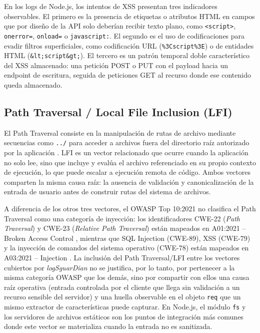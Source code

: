 En los logs de Node.js, los intentos de XSS presentan tres indicadores observables. El primero es
la presencia de etiquetas o atributos HTML en campos que por diseño de la API solo deberían
recibir texto plano, como \texttt{<script>}, \texttt{onerror=}, \texttt{onload=} o \texttt{javascript:}.
El segundo es el uso de codificaciones para evadir filtros superficiales, como codificación URL
(\texttt{\%3Cscript\%3E}) o de entidades HTML (\texttt{\&lt;script\&gt;}). El tercero es un patrón
temporal doble característico del XSS almacenado: una petición POST o PUT con el payload hacia
un endpoint de escritura, seguida de peticiones GET al recurso donde ese contenido queda
almacenado.

\subsection{Path Traversal / Local File Inclusion (LFI)}
El Path Traversal consiste en la manipulación de rutas de archivo mediante secuencias como
\texttt{../} para acceder a archivos fuera del directorio raíz autorizado por la aplicación \cite{owasptraversal}. LFI es un vector relacionado que ocurre cuando la aplicación
no solo lee, sino que incluye y evalúa el archivo referenciado en su propio contexto de
ejecución, lo que puede escalar a ejecución remota de código. Ambos vectores comparten la misma
causa raíz: la ausencia de validación y canonicalización de la entrada de usuario antes de
construir rutas del sistema de archivos.

A diferencia de los otros tres vectores, el OWASP Top 10:2021 no clasifica el Path Traversal
como una categoría de inyección: los identificadores CWE-22 (\textit{Path Traversal}) y CWE-23
(\textit{Relative Path Traversal}) están mapeados en A01:2021 -- Broken Access Control
\cite{owaspa01_2021}, mientras que SQL Injection (CWE-89), XSS (CWE-79) y la inyección de comandos
del sistema operativo (CWE-78) están mapeados en A03:2021 -- Injection \cite{owaspa03_2021}. La
inclusión del Path Traversal/LFI entre los vectores cubiertos por \textit{logSguarDian} no se
justifica, por lo tanto, por pertenecer a la misma categoría OWASP que los demás, sino por
compartir con ellos una causa raíz operativa (entrada controlada por el cliente que llega sin
validación a un recurso sensible del servidor) y una huella observable en el objeto \texttt{req}
que un mismo extractor de características puede capturar. En Node.js, el módulo \texttt{fs} y los
servidores de archivos estáticos son los puntos de integración más comunes donde este vector se
materializa cuando la entrada no es sanitizada.

